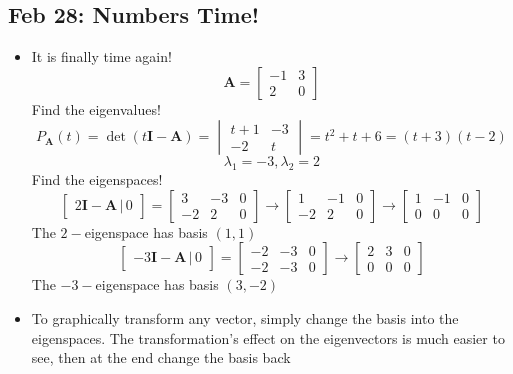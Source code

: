 \documentclass[10pt, oneside]{article}
\newcommand{\mat}[1]{\mathbf{#1}}
\begin{document}
\subsection{Feb 28: Numbers Time!}
\begin{itemize}
    \item It is finally time again!
        \[\mat{A} = \begin{bmatrix}
            -1 & 3\\
            2 & 0
        \end{bmatrix}\]
        Find the eigenvalues!
        \[P_\mat{A}(t) = \det (t\mat{I} - \mat{A}) = 
        \begin{vmatrix}
            t+1 & -3\\
            -2 & t
        \end{vmatrix} = t^2+t+6 = (t+3)(t-2)\]
        \[\lambda_1 = -3, \lambda_2 = 2\]
        Find the eigenspaces!
        \[\begin{bmatrix}
            2\mat{I} - \mat{A} \, | \, 0
        \end{bmatrix} = 
        \begin{bmatrix}
            3 & -3 & 0\\
            -2 & 2 & 0
        \end{bmatrix} \rightarrow
        \begin{bmatrix}
            1 & -1 & 0\\
            -2 & 2 & 0
        \end{bmatrix} \rightarrow
        \begin{bmatrix}
            1 & -1 & 0\\
            0 & 0 & 0
        \end{bmatrix}\]
        The $2-$eigenspace has basis $(1,1)$
        \[\begin{bmatrix}
            -3\mat{I} - \mat{A} \, | \, 0
        \end{bmatrix} = 
        \begin{bmatrix}
            -2 & -3 & 0\\
            -2 & -3 & 0
        \end{bmatrix} \rightarrow
        \begin{bmatrix}
            2 & 3 & 0\\
            0 & 0 & 0
        \end{bmatrix}\]
        The $-3-$eigenspace has basis $(3,-2)$
    \item To graphically transform any vector, simply change the basis into the eigenspaces. The transformation's effect on the eigenvectors is much easier to see, then at the end change the basis back

\end{itemize}
\end{document}

